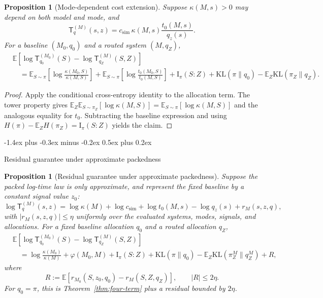\documentclass[10pt,twocolumn]{article}
\makeatletter
\theoremstyle{paperplain}
\newtheorem{proposition}[theorem]{Proposition}
\theoremstyle{paperdefinition}
\theoremstyle{paperremark}
\renewcommand{\subsection}{%
  \@startsection{subsection}{2}{\z@}%
    {-1.4ex plus -0.3ex minus -0.2ex}%
    {0.5ex plus 0.2ex}%
    {\normalfont\normalsize\bfseries\raggedright}}
\newcommand{\KL}{\mathrm{KL}}
\newcommand{\I}{\mathrm{I}}
\newcommand{\E}{\mathbb{E}}
\makeatother
\begin{document}
\begin{proposition}[Mode-dependent cost extension]
\label{prop:mode-dependent-cost}
Suppose $\kappa(M,s)>0$ may depend on both model and mode, and
\[
\mathsf{T}_q^{(M)}(s,z)
=c_{\mathrm{sim}}\,\kappa(M,s)\frac{t_0(M,s)}{q_z(s)}.
\]
For a baseline $(M_0,q_0)$ and a routed system $(M,q_Z)$,
\[
\begin{aligned}
&\E\!\left[\log\mathsf{T}_{q_0}^{(M_0)}(S)-\log\mathsf{T}_{q_Z}^{(M)}(S,Z)\right]\\
&\quad=
\E_{S\sim\pi}\!\left[\log\frac{\kappa(M_0,S)}{\kappa(M,S)}\right]
+\E_{S\sim\pi}\!\left[\log\frac{t_0(M_0,S)}{t_0(M,S)}\right]
+\I_\pi(S:Z)+\KL(\pi\|q_0)-\E_Z\KL(\pi_Z\|q_Z).
\end{aligned}
\]
\end{proposition}

\begin{proof}
Apply the conditional cross-entropy identity to the allocation term. The tower property gives
$\E_Z\E_{S\sim\pi_Z}[\log\kappa(M,S)]=\E_{S\sim\pi}[\log\kappa(M,S)]$
and the analogous equality for $t_0$. Subtracting the baseline expression and using
$H(\pi)-\E_ZH(\pi_Z)=\I_\pi(S:Z)$ yields the claim.
\end{proof}

\subsection{Residual guarantee under approximate packedness}
\label{app:proof:prop:approximation-guarantee}

\begin{proposition}[Residual guarantee under approximate packedness]
\label{prop:approximation-guarantee}
Suppose the packed log-time law is only approximate, and represent the fixed baseline by a constant signal value $z_0$:
\[
\log \mathsf{T}_{q}^{(M)}(s,z)
=\log\kappa(M)+\log c_{\mathrm{sim}}+\log t_0(M,s)-\log q_z(s)
+r_M(s,z,q),
\]
with $|r_M(s,z,q)|\le\eta$ uniformly over the evaluated systems, modes, signals, and allocations.
For a fixed baseline allocation $q_0$ and a routed allocation $q_Z$,
\[
\begin{aligned}
&\E\!\left[\log \mathsf{T}_{q_0}^{(M_0)}(S)-\log \mathsf{T}_{q_Z}^{(M)}(S,Z)\right]\\
&\quad=
\log\frac{\kappa(M_0)}{\kappa(M)}
+\varphi(M_0,M)+\I_\pi(S:Z)
+\KL(\pi\|q_0)-\E_Z\KL(\pi_Z^M\|q_Z^M)+R,
\end{aligned}
\]
where
\[
R:=\E[r_{M_0}(S,z_0,q_0)-r_M(S,Z,q_Z)],
\qquad |R|\le 2\eta.
\]
For $q_0=\pi$, this is Theorem~\ref{thm:four-term} plus a residual bounded by $2\eta$.
\end{proposition}
\end{document}
